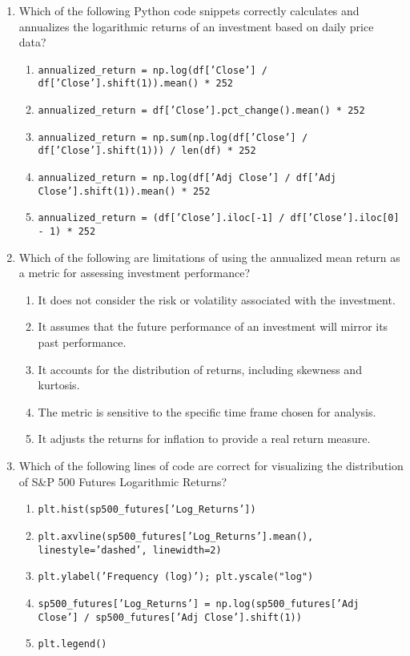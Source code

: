 \documentclass{article}
\begin{document}
\begin{enumerate}
    \item Which of the following Python code snippets correctly calculates and annualizes the logarithmic returns of an investment based on daily price data?
    \begin{enumerate}
        \item \texttt{annualized\_return = np.log(df['Close'] / df['Close'].shift(1)).mean() * 252}
        \item \texttt{annualized\_return = df['Close'].pct\_change().mean() * 252}
        \item \texttt{annualized\_return = np.sum(np.log(df['Close'] / df['Close'].shift(1))) / len(df) * 252}
        \item \texttt{annualized\_return = np.log(df['Adj Close'] / df['Adj Close'].shift(1)).mean() * 252}
        \item \texttt{annualized\_return = (df['Close'].iloc[-1] / df['Close'].iloc[0] - 1) * 252}
    \end{enumerate}

    \item Which of the following are limitations of using the annualized mean return as a metric for assessing investment performance?
        \begin{enumerate}
            \item It does not consider the risk or volatility associated with the investment.
            \item It assumes that the future performance of an investment will mirror its past performance.
            \item It accounts for the distribution of returns, including skewness and kurtosis.
            \item The metric is sensitive to the specific time frame chosen for analysis.
            \item It adjusts the returns for inflation to provide a real return measure.
        \end{enumerate}

    \item Which of the following lines of code are correct for visualizing the distribution of S\&P 500 Futures Logarithmic Returns?
        \begin{enumerate}
            \item \texttt{plt.hist(sp500\_futures['Log\_Returns'])}
            \item \texttt{plt.axvline(sp500\_futures['Log\_Returns'].mean(), linestyle='dashed', linewidth=2)}
            \item \texttt{plt.ylabel('Frequency (log)'); plt.yscale("log")}
            \item \texttt{sp500\_futures['Log\_Returns'] = np.log(sp500\_futures['Adj Close'] / sp500\_futures['Adj Close'].shift(1))}
            \item \texttt{plt.legend()}
        \end{enumerate}




\end{enumerate}
\end{document}
